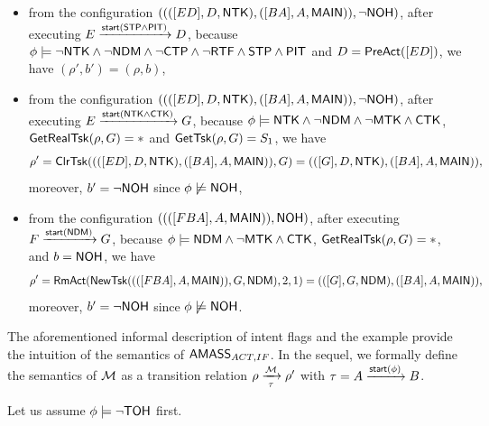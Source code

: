 \begin{example}
{\begin{itemize}
		$$\rho' = \push((([D],D,\ntkflag),([BA], A, \mainflag)), E) = (([ED],D,\ntkflag),([BA], A, \mainflag)),$$
		moreover, $b' = \neg \nohflag$ since $\phi \not \models \nohflag$,
        \item from the configuration $((([ED],D,{\sf NTK}),([BA], A, {\sf MAIN})),\neg{\sf NOH})$, after executing $E \xrightarrow{{\mathsf{start} }({\sf STP}\wedge{\sf PIT})} D$, because $\phi \models \neg {\sf NTK} \wedge \neg {\sf NDM}\wedge\neg{\sf CTP}\wedge\neg{\sf RTF}\wedge{\sf STP}\wedge{\sf PIT}$ and $D = \mathsf{PreAct}([ED])$, we have $(\rho',b') = (\rho,b)$, 
        \item from the configuration $((([ED],D,{\sf NTK}),([BA], A, {\sf MAIN})),\neg{\sf NOH})$, after executing $E \xrightarrow{{\mathsf{start} }({\sf NTK}\wedge{\sf CTK})} G$,  because $\phi \models {\sf NTK} \wedge \neg {\sf NDM}\wedge\neg{\sf MTK}\wedge{\sf CTK}$, $\mathsf{GetRealTsk}(\rho,G) = *$ and $\mathsf{GetTsk}(\rho,G) = S_1$, we have 
		$$\rho' = \mathsf{ClrTsk}((([ED],D,{\sf NTK}),([BA], A, {\sf MAIN})), G) = (([G],D,{\sf NTK}),([BA], A, {\sf MAIN})),$$
		 moreover, $b' = \neg \nohflag$ since $\phi \not \models \nohflag$,
        \item from the configuration $((([FBA], A, {\sf MAIN})),{\sf NOH})$, after executing $F \xrightarrow{{\mathsf{start} }({\sf NDM})} G$, because $\phi \models {\sf NDM}\wedge\neg{\sf MTK}\wedge{\sf CTK}$, $\mathsf{GetRealTsk}(\rho,G) = *$, and $b = {\sf NOH}$,  we have 
		$$\rho' = \mathsf{RmAct}(\mathsf{NewTsk}((([FBA], A, {\sf MAIN})),G,{\sf NDM}),2,1) = (([G],G,{\sf NDM}),([BA], A, {\sf MAIN})),$$ 
		moreover, $b' = \neg \nohflag$ since $\phi \not \models \nohflag$.
\end{itemize}
}
%    
\end{example}

The aforementioned informal description of intent flags and the example %
provide the intuition of %
the semantics of $\textsf{AMASS}_{ACT,IF}$. 
In the sequel, we formally define the semantics of ${\mathcal{M} }$ as a transition relation $\rho \xrightarrow[\tau]{{\mathcal{M} }} \rho'$ with $\tau = A \xrightarrow{{\mathsf{start} }(\phi)} B$.

Let us assume $\phi \models \neg {\sf TOH}$ first.

\smallskip



